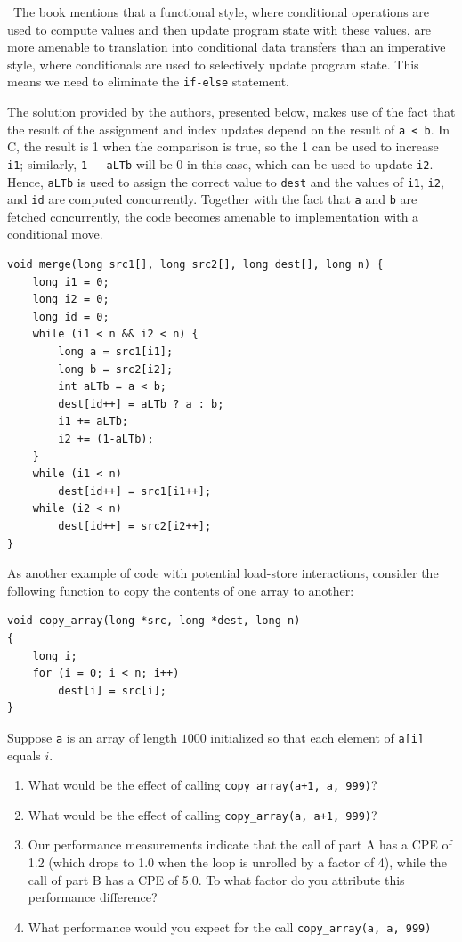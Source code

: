 \documentclass[12pt]{article}
\newenvironment{ex}[2][Exercise]{\begin{trivlist}
		\item[\hskip \labelsep {\bfseries #1}\hskip \labelsep {\bfseries #2.}]}{\end{trivlist}}
\newenvironment{sol}[1][Solution]{\begin{trivlist}
		\item[\hskip \labelsep {\bfseries #1:}]}{\end{trivlist}}
\begin{document}
\begin{sol}
	\
	The book mentions that a functional style, where conditional operations are used to compute
	values and then update program state with these values, are more amenable to translation
	into conditional data transfers than an imperative style, where conditionals are used to
	selectively update program state. This means we need to eliminate the \texttt{if-else} statement.
	
	The solution provided by the authors, presented below, makes use of the fact that the result of
	the assignment and index updates
	depend on the result of \texttt{a < b}. In C, the result is 1 when the comparison is true,
	so the 1 can be used to increase \texttt{i1}; similarly, \texttt{1 - aLTb} will be 0
	in this case, which can be used to update \texttt{i2}. Hence, \texttt{aLTb} is used to
	assign the correct value to \texttt{dest} and the values of \texttt{i1}, \texttt{i2}, and
	\texttt{id} are computed concurrently. Together with the fact that \texttt{a} and \texttt{b}
	are fetched concurrently, the code becomes amenable to implementation with a conditional move.
	\begin{lstlisting}
void merge(long src1[], long src2[], long dest[], long n) {
	long i1 = 0;
	long i2 = 0;
	long id = 0;
	while (i1 < n && i2 < n) {
		long a = src1[i1];
		long b = src2[i2];
		int aLTb = a < b;
		dest[id++] = aLTb ? a : b;
		i1 += aLTb;
		i2 += (1-aLTb);
	}
	while (i1 < n)
		dest[id++] = src1[i1++];
	while (i2 < n)
		dest[id++] = src2[i2++];
}
	\end{lstlisting}
\end{sol}

\begin{ex}{5.10}
	As another example of code with potential load-store interactions, consider the following
	function to copy the contents of one array to another:
	\begin{lstlisting}
void copy_array(long *src, long *dest, long n)
{
	long i;
	for (i = 0; i < n; i++)
		dest[i] = src[i];
}
	\end{lstlisting}
	Suppose \texttt{a} is an array of length $1000$ initialized so that each element of
	\texttt{a[i]} equals $i$.
	\begin{enumerate}[label=(\alph*)]
		\item What would be the effect of calling \texttt{copy\_array(a+1, a, 999)}?
		\item What would be the effect of calling \texttt{copy\_array(a, a+1, 999)}?
		\item Our performance measurements indicate that the call of part A has a CPE of 1.2
		(which drops to 1.0 when the loop is unrolled by a factor of 4), while the call of part
		B has a CPE of 5.0. To what factor do you attribute this performance difference?
		\item What performance would you expect for the call \texttt{copy\_array(a, a, 999)}
	\end{enumerate}
\end{ex}
\end{document}
